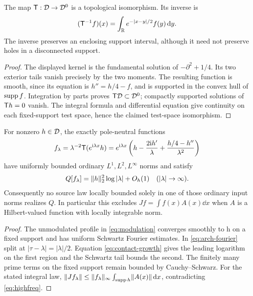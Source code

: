 \begin{lemma}\label{lem:T}
The map $\mathsf T:\mathcal D\to\mathcal D^0$ is a topological isomorphism. Its inverse is
\begin{equation}
(\mathsf T^{-1}f)(x)=\int_\mathbb R e^{-|x-y|/2}f(y)\,\mathrm d y.
\end{equation}
The inverse preserves an enclosing support interval, although it need
not preserve holes in a disconnected support.
\end{lemma}
\begin{proof}
The displayed kernel is the fundamental solution of
$-\partial^2+1/4$. Its two exterior tails vanish precisely by the two
moments. The resulting function is smooth, since its equation is
$h''=h/4-f$, and is supported in the convex hull of $\operatorname{supp} f$.
Integration by parts proves $\mathsf T\mathcal D\subset\mathcal D^0$; compactly supported
solutions of $\mathsf T h=0$ vanish. The integral formula and differential
equation give continuity on each fixed-support test space, hence the
claimed test-space isomorphism.
\end{proof}

\begin{proposition}\label{prop:highfreq}
For nonzero $h\in\mathcal D$, the exactly pole-neutral functions
\begin{equation}\label{eq:modulation}
f_\lambda=\lambda^{-2}\mathsf T(e^{\mathrm i\lambda x}h)
=e^{\mathrm i\lambda x}\left(h-\frac{2\mathrm i h'}\lambda+
                     \frac{h/4-h''}{\lambda^2}\right)
\end{equation}
have uniformly bounded ordinary $L^1,L^2,L^\infty$ norms and satisfy
\begin{equation}\label{eq:highfreq}
Q[f_\lambda]=\lVert h\rVert_2^2\log|\lambda|+O_h(1)
\quad (|\lambda|\to\infty).
\end{equation}
Consequently no source law locally bounded solely in one of those
ordinary input norms realizes $Q$. In particular this excludes
$Jf=\int f(x)A(x)\dd x$ when $A$ is a Hilbert-valued function with
locally integrable norm.
\end{proposition}
\begin{proof}
The unmodulated profile in \eqref{eq:modulation} converges smoothly to h
on a fixed support and has uniform Schwartz Fourier estimates.
In \eqref{eq:arch-fourier} split at $|\tau-\lambda|=|\lambda|/2$.
Equation \eqref{eq:contact-growth} gives the leading logarithm on the
first region and the Schwartz tail bounds the second. The finitely many
prime terms on the fixed support remain bounded by Cauchy--Schwarz.
For the stated integral law,
$\lVert Jf_\lambda\rVert\le\lVert f_\lambda\rVert_\infty
\int_{\operatorname{supp} h}\lVert A(x)\rVert\,\mathrm d x$, contradicting \eqref{eq:highfreq}.
\end{proof}

